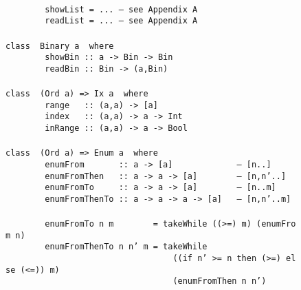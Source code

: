 \begin{figure}
{\mbox{\tt }\\[-8pt]
\mbox{\tt \ \ \ \ \ \ \ \ showList\ =\ ...\ --\ see\ Appendix\ A\ \ }\\
\mbox{\tt \ \ \ \ \ \ \ \ readList\ =\ ...\ --\ see\ Appendix\ A\ \ }\\
\mbox{\tt }\\[-8pt]
\mbox{\tt class\ \ Binary\ a\ \ where\ \ \ \ \ \ \ \ \ \ \ \ \ \ \ \ \ \ \ \ \ \ }\\
\mbox{\tt \ \ \ \ \ \ \ \ showBin\ ::\ a\ ->\ Bin\ ->\ Bin\ }\\
\mbox{\tt \ \ \ \ \ \ \ \ readBin\ ::\ Bin\ ->\ (a,Bin)\ \ }\\
\mbox{\tt }\\[-8pt]
\mbox{\tt class\ \ (Ord\ a)\ =>\ Ix\ a\ \ where}\\
\mbox{\tt \ \ \ \ \ \ \ \ range\ \ \ ::\ (a,a)\ ->\ [a]}\\
\mbox{\tt \ \ \ \ \ \ \ \ index\ \ \ ::\ (a,a)\ ->\ a\ ->\ Int}\\
\mbox{\tt \ \ \ \ \ \ \ \ inRange\ ::\ (a,a)\ ->\ a\ ->\ Bool}\\
\mbox{\tt }\\[-8pt]
\mbox{\tt class\ \ (Ord\ a)\ =>\ Enum\ a\ \ where}\\
\mbox{\tt \ \ \ \ \ \ \ \ enumFrom\ \ \ \ \ \ \ ::\ a\ ->\ [a]\ \ \ \ \ \ \ \ \ \ \ \ \ --\ [n..]}\\
\mbox{\tt \ \ \ \ \ \ \ \ enumFromThen\ \ \ ::\ a\ ->\ a\ ->\ [a]\ \ \ \ \ \ \ \ --\ [n,n'..]}\\
\mbox{\tt \ \ \ \ \ \ \ \ enumFromTo\ \ \ \ \ ::\ a\ ->\ a\ ->\ [a]\ \ \ \ \ \ \ \ --\ [n..m]}\\
\mbox{\tt \ \ \ \ \ \ \ \ enumFromThenTo\ ::\ a\ ->\ a\ ->\ a\ ->\ [a]\ \ \ --\ [n,n'..m]}\\
\mbox{\tt }\\[-8pt]
\mbox{\tt \ \ \ \ \ \ \ \ enumFromTo\ n\ m\ \ \ \ \ \ \ \ =\ takeWhile\ ((>=)\ m)\ (enumFrom\ n)}\\
\mbox{\tt \ \ \ \ \ \ \ \ enumFromThenTo\ n\ n'\ m\ =\ takeWhile}\\
\mbox{\tt \ \ \ \ \ \ \ \ \ \ \ \ \ \ \ \ \ \ \ \ \ \ \ \ \ \ \ \ \ \ \ \ \ \ ((if\ n'\ >=\ n\ then\ (>=)\ else\ (<=))\ m)}\\
\mbox{\tt \ \ \ \ \ \ \ \ \ \ \ \ \ \ \ \ \ \ \ \ \ \ \ \ \ \ \ \ \ \ \ \ \ \ (enumFromThen\ n\ n')}
}
\label{standard-classes}
\indextt{==}\indextt{/=}
\indextt{<}\indextt{<=}\indextt{>}\indextt{>=}
\end{figure}

